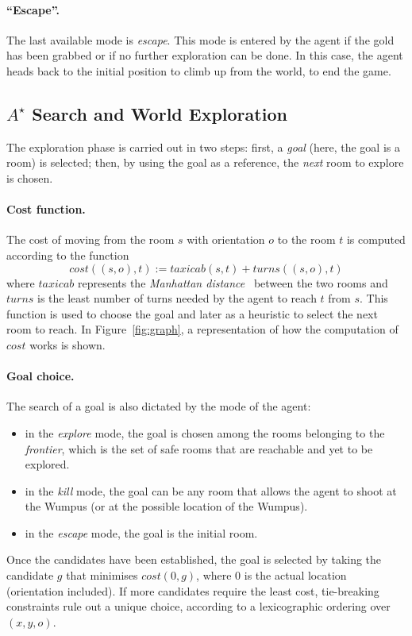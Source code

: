 \documentclass{llncs}
\begin{document}
\paragraph{\enquote{Escape}.} The last available mode is \emph{escape}.
This mode is entered by the agent if the gold has been grabbed or if no further exploration can be done.
In this case, the agent heads back to the initial position to climb up from the world, to end the game.

\subsection{$A^{\star}$ Search and World Exploration}

The exploration phase is carried out in two steps: first, a \emph{goal} (here, the goal is a room) is selected; then, by using the goal as a reference, the \emph{next} room to explore is chosen.

\paragraph{Cost function.} The cost of moving from the room $s$ with orientation $o$ to the room $t$ is computed according to the function 
\begin{equation}	
	cost((s,o),t) := taxicab(s,t) + turns((s,o),t)
\end{equation}
where $taxicab$ represents the \emph{Manhattan distance}~\cite{Manhattan} between the two rooms and $turns$ is the least number of turns needed by the agent to reach $t$ from $s$.
This function is used to choose the goal and later as a heuristic to select the next room to reach.
In Figure~\ref{fig:graph}, a representation of how the computation of $cost$ works is shown.

\paragraph{Goal choice.} The search of a goal is also dictated by the mode of the agent:
\begin{itemize}
	\item in the \emph{explore} mode, the goal is chosen among the rooms belonging to the \emph{frontier}, which is the set of safe rooms that are reachable and yet to be explored.
	\item in the \emph{kill} mode, the goal can be any room that allows the agent to shoot at the Wumpus (or at the possible location of the Wumpus).
	\item in the \emph{escape} mode, the goal is the initial room.
\end{itemize}
Once the candidates have been established, the goal is selected by taking the candidate $g$ that minimises $cost(0,g)$, where $0$ is the actual location (orientation included).
If more candidates require the least cost, tie-breaking constraints rule out a unique choice, according to a lexicographic ordering over $(x,y,o)$.
\end{document}
